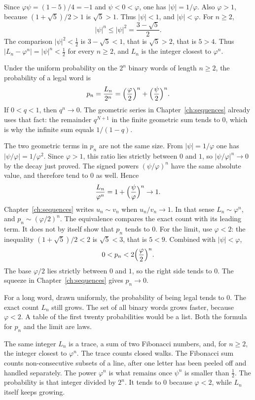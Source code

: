 Since $\varphi\psi=(1-5)/4=-1$ and $\psi<0<\varphi$, one has $|\psi|=1/\varphi$. Also $\varphi>1$, because $(1+\sqrt5)/2>1$ is $\sqrt5>1$. Thus $|\psi|<1$, and $|\psi|<\varphi$. For $n\ge2$,
\[
|\psi|^n\le|\psi|^2=\frac{3-\sqrt5}2.
\]
The comparison $|\psi|^2<\frac12$ is $3-\sqrt5<1$, that is $\sqrt5>2$, that is $5>4$. Thus $|L_n-\varphi^n|=|\psi|^n<\frac12$ for every $n\ge2$, and $L_n$ is the integer closest to $\varphi^n$.

Under the uniform probability on the $2^n$ binary words of length $n\ge2$, the probability of a legal word is
\[
p_n=\frac{L_n}{2^n}=\Bigl(\frac{\varphi}2\Bigr)^n+\Bigl(\frac{\psi}2\Bigr)^n.
\]
If $0<q<1$, then $q^n\to0$. The geometric series in Chapter~\ref{ch:sequences} already uses that fact: the remainder $q^{N+1}$ in the finite geometric sum tends to $0$, which is why the infinite sum equals $1/(1-q)$.

The two geometric terms in $p_n$ are not the same size. From $|\psi|=1/\varphi$ one has $|\psi/\varphi|=1/\varphi^2$. Since $\varphi>1$, this ratio lies strictly between $0$ and $1$, so $|\psi/\varphi|^n\to0$ by the decay just proved. The signed powers $(\psi/\varphi)^n$ have the same absolute value, and therefore tend to $0$ as well. Hence
\[
\frac{L_n}{\varphi^n}=1+\Bigl(\frac{\psi}{\varphi}\Bigr)^n\to1.
\]
Chapter~\ref{ch:sequences} writes $u_n\sim v_n$ when $u_n/v_n\to1$. In that sense $L_n\sim\varphi^n$, and $p_n\sim(\varphi/2)^n$. The equivalence compares the exact count with its leading term. It does not by itself show that $p_n$ tends to $0$. For the limit, use $\varphi<2$: the inequality $(1+\sqrt5)/2<2$ is $\sqrt5<3$, that is $5<9$. Combined with $|\psi|<\varphi$,
\[
0<p_n<2\Bigl(\frac{\varphi}2\Bigr)^n.
\]
The base $\varphi/2$ lies strictly between $0$ and $1$, so the right side tends to $0$. The squeeze in Chapter~\ref{ch:sequences} gives $p_n\to0$.

For a long word, drawn uniformly, the probability of being legal tends to $0$. The exact count $L_n$ still grows. The set of all binary words grows faster, because $\varphi<2$. A table of the first twenty probabilities would be a list. Both the formula for $p_n$ and the limit are laws.

\begin{beauty}
The same integer $L_n$ is a trace, a sum of two Fibonacci numbers, and, for $n\ge2$, the integer closest to $\varphi^n$. The trace counts closed walks. The Fibonacci sum counts non-consecutive subsets of a line, after one letter has been peeled off and handled separately. The power $\varphi^n$ is what remains once $\psi^n$ is smaller than $\frac12$. The probability is that integer divided by $2^n$. It tends to $0$ because $\varphi<2$, while $L_n$ itself keeps growing.
\end{beauty}

